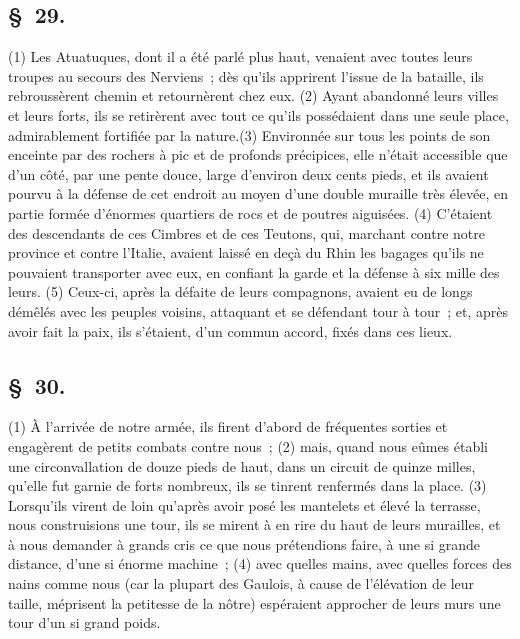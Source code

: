 \documentclass[french,twoside]{book} %
\begin{document}
\subsection[{§ 29.}]{ \textsc{§ 29.} }
\noindent (1) Les Atuatuques, dont il a été parlé plus haut, venaient avec toutes leurs troupes au secours des Nerviens ; dès qu’ils apprirent l’issue de la bataille, ils rebroussèrent chemin et retournèrent chez eux. (2) Ayant abandonné leurs villes et leurs forts, ils se retirèrent avec tout ce qu’ils possédaient dans une seule place, admirablement fortifiée par la nature.(3) Environnée sur tous les points de son enceinte par des rochers à pic et de profonds précipices, elle n’était accessible que d’un côté, par une pente douce, large d’environ deux cents pieds, et ils avaient pourvu à la défense de cet endroit au moyen d’une double muraille très élevée, en partie formée d’énormes quartiers de rocs et de poutres aiguisées. (4) C'étaient des descendants de ces Cimbres et de ces Teutons, qui, marchant contre notre province et contre l’Italie, avaient laissé en deçà du Rhin les bagages qu’ils ne pouvaient transporter avec eux, en confiant la garde et la défense à six mille des leurs. (5) Ceux-ci, après la défaite de leurs compagnons, avaient eu de longs démêlés avec les peuples voisins, attaquant et se défendant tour à tour ; et, après avoir fait la paix, ils s’étaient, d’un commun accord, fixés dans ces lieux.
\subsection[{§ 30.}]{ \textsc{§ 30.} }
\noindent (1) À l’arrivée de notre armée, ils firent d’abord de fréquentes sorties et engagèrent de petits combats contre nous ; (2) mais, quand nous eûmes établi une circonvallation de douze pieds de haut, dans un circuit de quinze milles, qu’elle fut garnie de forts nombreux, ils se tinrent renfermés dans la place. (3) Lorsqu’ils virent de loin qu’après avoir posé les mantelets et élevé la terrasse, nous construisions une tour, ils se mirent à en rire du haut de leurs murailles, et à nous demander à grands cris ce que nous prétendions faire, à une si grande distance, d’une si énorme machine ; (4) avec quelles mains, avec quelles forces des nains comme nous (car la plupart des Gaulois, à cause de l’élévation de leur taille, méprisent la petitesse de la nôtre) espéraient approcher de leurs murs une tour d’un si grand poids.
\end{document}
